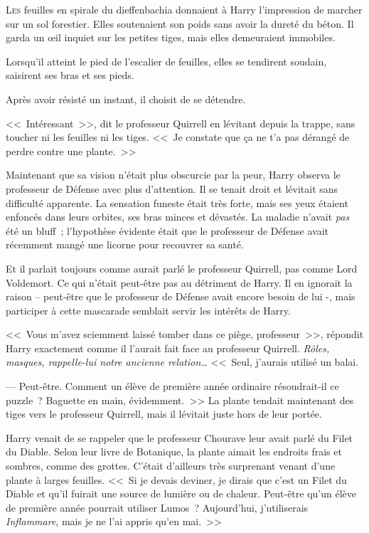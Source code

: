 
\lettrine{L}{es} feuilles en spirale du dieffenbachia donnaient à Harry l'impression de marcher sur un sol forestier. Elles soutenaient son poids sans avoir la dureté du béton. Il garda un œil inquiet sur les petites tiges, mais elles demeuraient immobiles.

Lorsqu'il atteint le pied de l'escalier de feuilles, elles se tendirent soudain, saisirent ses bras et ses pieds.

Après avoir résisté un instant, il choisit de se détendre.

<<~Intéressant~>>, dit le professeur Quirrell en lévitant depuis la trappe, sans toucher ni les feuilles ni les tiges. <<~Je constate que ça ne t'a pas dérangé de perdre contre une plante.~>>

Maintenant que sa vision n'était plus obscurcie par la peur, Harry observa le professeur de Défense avec plus d'attention. Il se tenait droit et lévitait sans difficulté apparente. La sensation funeste était très forte, mais ses yeux étaient enfoncés dans leurs orbites, ses bras minces et dévastés. La maladie n'avait \emph{pas} été un bluff~; l'hypothèse évidente était que le professeur de Défense avait récemment mangé une licorne pour recouvrer sa santé.

Et il parlait toujours comme aurait parlé le professeur Quirrell, pas comme Lord Voldemort. Ce qui n'était peut-être pas au détriment de Harry. Il en ignorait la raison -- peut-être que le professeur de Défense avait encore besoin de lui -, mais participer à cette mascarade semblait servir les intérêts de Harry.

<<~Vous m'avez sciemment laissé tomber dans ce piège, professeur~>>, répondit Harry exactement comme il l'aurait fait face au professeur Quirrell. \emph{Rôles, masques, rappelle-lui notre ancienne relation…} <<~Seul, j'aurais utilisé un balai.

--- Peut-être. Comment un élève de première année ordinaire résoudrait-il ce puzzle~? Baguette en main, évidemment.~>> La plante tendait maintenant des tiges vers le professeur Quirrell, mais il lévitait juste hors de leur portée.

Harry venait de se rappeler que le professeur Chourave leur avait parlé du Filet du Diable. Selon leur livre de Botanique, la plante aimait les endroits frais et sombres, comme des grottes. C'était d'ailleurs très surprenant venant d'une plante à larges feuilles. <<~Si je devais deviner, je dirais que c'est un Filet du Diable et qu'il fuirait une source de lumière ou de chaleur. Peut-être qu'un élève de première année pourrait utiliser Lumos~? Aujourd'hui, j'utiliserais \emph{Inflammare}, mais je ne l'ai appris qu'en mai.~>>

